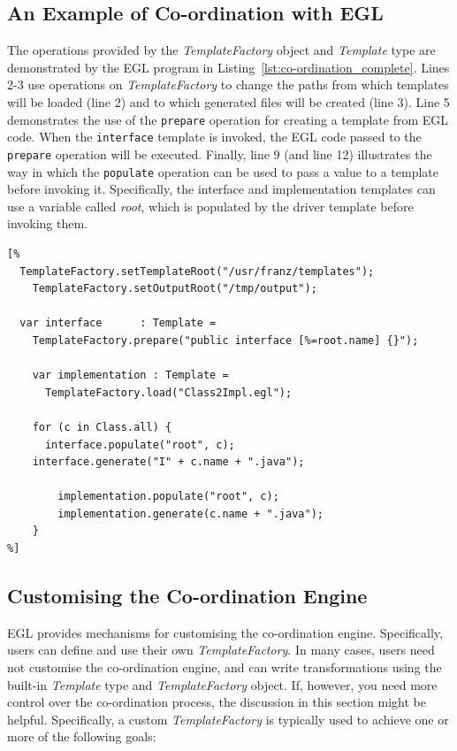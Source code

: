\subsection{An Example of Co-ordination with EGL}
\label{sec:example_of_co-ordination}
The operations provided by the \emph{TemplateFactory} object and \emph{Template} type are demonstrated by the EGL program in Listing~\ref{lst:co-ordination_complete}. Lines 2-3 use operations on \emph{TemplateFactory} to change the paths from which templates will be loaded (line 2) and to which generated files will be created (line 3). Line 5 demonstrates the use of the \texttt{prepare} operation for creating a template from EGL code. When the \texttt{interface} template is invoked, the EGL code passed to the \texttt{prepare} operation will be executed. Finally, line 9 (and line 12) illustrates the way in which the \texttt{populate} operation can be used to pass a value to a template before invoking it. Specifically, the interface and implementation templates can use a variable called \emph{root}, which is populated by the driver template before invoking them.

\begin{lstlisting}[float=h, caption=Using the various operations provided by the Template type and TemplateFactory object., label=lst:co-ordination_complete, language=EGL]
[%
  TemplateFactory.setTemplateRoot("/usr/franz/templates");
	TemplateFactory.setOutputRoot("/tmp/output");

  var interface      : Template =
    TemplateFactory.prepare("public interface [%=root.name] {}");
	
	var implementation : Template = 
	  TemplateFactory.load("Class2Impl.egl");

	for (c in Class.all) {
	  interface.populate("root", c);	
  	interface.generate("I" + c.name + ".java");
		
		implementation.populate("root", c);
		implementation.generate(c.name + ".java");
	}
%]
\end{lstlisting}

\subsection{Customising the Co-ordination Engine}
\label{sec:custom_co-ordination}
EGL provides mechanisms for customising the co-ordination engine. Specifically, users can define and use their own \emph{TemplateFactory}. In many cases, users need not customise the co-ordination engine, and can write transformations using the built-in \emph{Template} type and \emph{TemplateFactory} object. If, 
however, you need more control over the co-ordination process, the discussion in this section might be helpful. Specifically, a custom \emph{TemplateFactory} is typically used to achieve one or more of the following goals:



